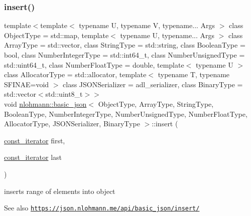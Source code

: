 \subsubsection{\texorpdfstring{insert()}{insert()}\hspace{0.1cm}{\footnotesize\ttfamily [6/6]}}
{\footnotesize\ttfamily template$<$template$<$ typename U, typename V, typename... Args $>$ class Object\+Type = std\+::map, template$<$ typename U, typename... Args $>$ class Array\+Type = std\+::vector, class String\+Type  = std\+::string, class Boolean\+Type  = bool, class Number\+Integer\+Type  = std\+::int64\+\_\+t, class Number\+Unsigned\+Type  = std\+::uint64\+\_\+t, class Number\+Float\+Type  = double, template$<$ typename U $>$ class Allocator\+Type = std\+::allocator, template$<$ typename T, typename S\+F\+I\+N\+A\+E=void $>$ class J\+S\+O\+N\+Serializer = adl\+\_\+serializer, class Binary\+Type  = std\+::vector$<$std\+::uint8\+\_\+t$>$$>$ \\
void \hyperlink{classnlohmann_1_1basic__json}{nlohmann\+::basic\+\_\+json}$<$ Object\+Type, Array\+Type, String\+Type, Boolean\+Type, Number\+Integer\+Type, Number\+Unsigned\+Type, Number\+Float\+Type, Allocator\+Type, J\+S\+O\+N\+Serializer, Binary\+Type $>$\+::insert (\begin{DoxyParamCaption}\item[{\hyperlink{classnlohmann_1_1basic__json_aebd2cfa7e4ded4e97cde9269bfeeea38}{const\+\_\+iterator}}]{first,  }\item[{\hyperlink{classnlohmann_1_1basic__json_aebd2cfa7e4ded4e97cde9269bfeeea38}{const\+\_\+iterator}}]{last }\end{DoxyParamCaption})\hspace{0.3cm}{\ttfamily [inline]}}



inserts range of elements into object 

\begin{DoxySeeAlso}{See also}
\href{https://json.nlohmann.me/api/basic_json/insert/}{\tt https\+://json.\+nlohmann.\+me/api/basic\+\_\+json/insert/} 
\end{DoxySeeAlso}
\mbox{\label{classnlohmann_1_1basic__json_ab5c8034e997c5b852b92bdc6a3f70994}} 
